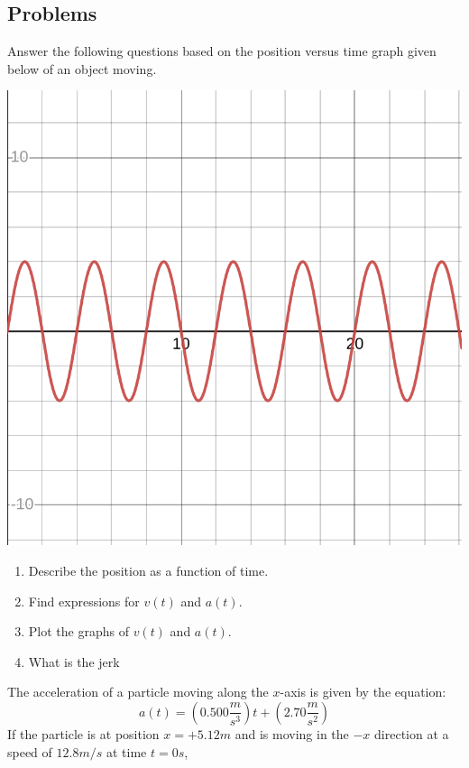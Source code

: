 \documentclass[12pt,addpoints]{exam}
\begin{document}
	\begin{questions}
		\subsection*{Problems}
		\question[15] Answer the following questions based on the position versus time graph given below of an object moving.
		\begin{center}
			\includegraphics[scale=0.35]{q1.png}
		\end{center}		
		\begin{enumerate}[label=(\Alph*)]
			\item Describe the position as a function of time. 
			\item Find expressions for $v(t)$ and $a(t)$.
			\item Plot the graphs of $v(t)$ and $a(t)$.
			\item What is the jerk 
		\end{enumerate}
		\question[15] The acceleration of a particle moving along the  $x$-axis is given by the equation:
		$$a \left( t \right) = \left(0.500\frac{m}{s^3}\right)t + \left(2.70 \frac{m}{s^2}\right) $$
		If the particle is at position $x=+5.12m$ and is moving in the $-x$
		direction at a speed of $12.8m/s$ at time $t=0s$,
		\begin{enumerate}[label*=(\Alph*)]

\end{enumerate}
\end{questions}
\end{document}
